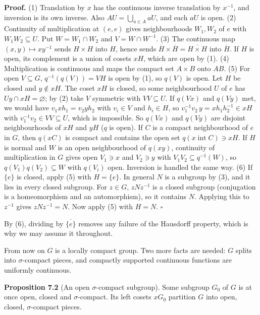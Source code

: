 \documentclass[
  english,
  11pt,
  a4paper,
]{article}
\begin{document}
\textbf{Proof.} (1) Translation by \(x\) has the continuous inverse
translation by \(x^{-1}\), and inversion is its own inverse. Also
\(AU=\bigcup_{a\in A}aU\), and each \(aU\) is open. (2) Continuity of
multiplication at \((e,e)\) gives neighbourhoods \(W_1,W_2\) of \(e\)
with \(W_1W_2\subseteq U\). Put \(W=W_1\cap W_2\) and
\(V=W\cap W^{-1}\). (3) The continuous map \((x,y)\mapsto xy^{-1}\)
sends \(H\times H\) into \(H\), hence sends
\(\overline H\times\overline H=\overline{H\times H}\) into
\(\overline H\). If \(H\) is open, its complement is a union of cosets
\(xH\), which are open by (1). (4) Multiplication is continuous and maps
the compact set \(A\times B\) onto \(AB\). (5) For open
\(V\subseteq G\), \(q^{-1}(q(V))=VH\) is open by (1), so \(q(V)\) is
open. Let \(H\) be closed and \(y\notin xH\). The coset \(xH\) is
closed, so some neighbourhood \(U\) of \(e\) has
\(Uy\cap xH=\varnothing\); by (2) take \(V\) symmetric with
\(VV\subseteq U\). If \(q(Vx)\) and \(q(Vy)\) met, we would have
\(v_1xh_1=v_2yh_2\) with \(v_i\in V\) and \(h_i\in H\), so
\(v_1^{-1}v_2\,y=xh_1h_2^{-1}\in xH\) with
\(v_1^{-1}v_2\in VV\subseteq U\), which is impossible. So \(q(Vx)\) and
\(q(Vy)\) are disjoint neighbourhoods of \(xH\) and \(yH\) (\(q\) is
open). If \(C\) is a compact neighbourhood of \(e\) in \(G\), then
\(q(xC)\) is compact and contains the open set
\(q(x\operatorname{int}C)\ni xH\). If \(H\) is normal and \(W\) is an
open neighbourhood of \(q(xy)\), continuity of multiplication in \(G\)
gives open \(V_1\ni x\) and \(V_2\ni y\) with
\(V_1V_2\subseteq q^{-1}(W)\), so \(q(V_1)q(V_2)\subseteq W\) with
\(q(V_i)\) open. Inversion is handled the same way. (6) If \(\{e\}\) is
closed, apply (5) with \(H=\{e\}\). In general \(N\) is a subgroup by
(3), and it lies in every closed subgroup. For \(z\in G\), \(zNz^{-1}\)
is a closed subgroup (conjugation is a homeomorphism and an
automorphism), so it contains \(N\). Applying this to \(z^{-1}\) gives
\(zNz^{-1}=N\). Now apply (5) with \(H=N\). \(\square\)

By (6), dividing by \(\overline{\{e\}}\) removes any failure of the
Hausdorff property, which is why we may assume it throughout.

From now on \(G\) is a locally compact group. Two more facts are needed:
\(G\) splits into \(\sigma\)-compact pieces, and compactly supported
continuous functions are uniformly continuous.

\textbf{Proposition 7.2} (An open \(\sigma\)-compact subgroup). Some
subgroup \(G_0\) of \(G\) is at once open, closed and
\(\sigma\)-compact. Its left cosets \(xG_0\) partition \(G\) into open,
closed, \(\sigma\)-compact pieces.
\end{document}
